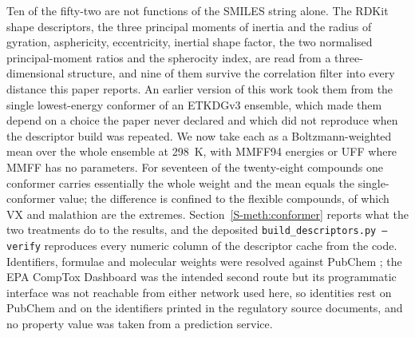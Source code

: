 \documentclass[1p,times]{elsarticle}
\begin{document}
Ten of the fifty-two are not functions of the SMILES string alone. The RDKit
shape descriptors, the three principal moments of inertia and the radius of
gyration, asphericity, eccentricity, inertial shape factor, the two normalised
principal-moment ratios and the spherocity index, are read from a
three-dimensional structure, and nine of them survive the correlation filter
into every distance this paper reports. An earlier version of this work took
them from the single lowest-energy conformer of an ETKDGv3 ensemble, which made
them depend on a choice the paper never declared and which did not reproduce
when the descriptor build was repeated. We now take each as a
Boltzmann-weighted mean over the whole ensemble at 298~K, with MMFF94 energies
or UFF where MMFF has no parameters. For seventeen of the twenty-eight
compounds one conformer carries essentially the whole weight and the mean
equals the single-conformer value; the difference is confined to the flexible
compounds, of which VX and malathion are the extremes. Section~\ref{S-meth:conformer}
reports what the two treatments do to the results, and the deposited
\texttt{build\_descriptors.py --verify} reproduces every numeric column of the
descriptor cache from the code.
Identifiers, formulae and molecular weights were resolved against PubChem
\cite{pubchem2025}; the EPA CompTox Dashboard \cite{williams2017} was the
intended second route but its programmatic interface was not reachable from
either network used here, so identities rest on PubChem and on the identifiers
printed in the regulatory source documents, and no property value was taken from
a prediction service.
\end{document}
